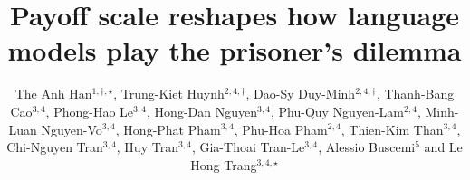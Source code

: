\documentclass[openacc]{rsproca_new}
\begin{document}
\title{Payoff scale reshapes how language models play the prisoner's dilemma}

\author{The Anh Han$^{1,\dagger,\star}$, Trung-Kiet Huynh$^{2,4,\dagger}$, Dao-Sy Duy-Minh$^{2,4,\dagger}$, Thanh-Bang Cao$^{3,4}$, Phong-Hao Le$^{3,4}$, Hong-Dan Nguyen$^{3,4}$, Phu-Quy Nguyen-Lam$^{2,4}$, Minh-Luan Nguyen-Vo$^{3,4}$, Hong-Phat Pham$^{3,4}$, Phu-Hoa Pham$^{2,4}$, Thien-Kim Than$^{3,4}$, Chi-Nguyen Tran$^{3,4}$, Huy Tran$^{3,4}$, Gia-Thoai Tran-Le$^{3,4}$, Alessio Buscemi$^{5}$ and Le Hong Trang$^{3,4,\star}$}

\address{$^{1}$School of Computing, Engineering and Digital Technologies, Teesside University, Middlesbrough, United Kingdom\\
$^{2}$Faculty of Information Technology, University of Science (HCMUS), Ho Chi Minh City, Vietnam\\
$^{3}$Faculty of Computer Science and Engineering, Ho Chi Minh City University of Technology (HCMUT), Ho Chi Minh City, Vietnam\\
$^{4}$Vietnam National University -- Ho Chi Minh City (VNU-HCM), Ho Chi Minh City, Vietnam\\
$^{5}$Luxembourg Institute of Science and Technology (LIST), Luxembourg\\[4pt]
$^{\dagger}$These authors contributed equally to this work.\\
$^{\star}$Corresponding authors.}

\subject{artificial intelligence, game theory, multi-agent systems}



\end{document}
